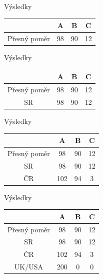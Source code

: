 \documentclass[17pt]{beamer}
\begin{document}
\begin{frame}{Výsledky}
\begin{center}
\begin{tabular}{|c|c|c|c|} \hline
  & A & B & C \\ \hline 
Přesný poměr & 98 & 90 & 12\\ \hline
\end{tabular}
\end{center} 
\end{frame}

\begin{frame}{Výsledky}
\begin{center}
\begin{tabular}{|c|c|c|c|} \hline
  & A & B & C \\ \hline 
Přesný poměr & 98 & 90 & 12\\ \hline
SR & 98 & 90 & 12\\ \hline
\end{tabular}
\end{center} 
\end{frame}

\begin{frame}{Výsledky}
\begin{center}
\begin{tabular}{|c|c|c|c|} \hline
  & A & B & C \\ \hline 
Přesný poměr & 98 & 90 & 12\\ \hline
SR & 98 & 90 & 12\\ \hline
ČR & 102 & 94 & 3\\ \hline
\end{tabular}
\end{center} 
\end{frame}

\begin{frame}{Výsledky}
\begin{center}
\begin{tabular}{|c|c|c|c|} \hline
  & A & B & C \\ \hline 
Přesný poměr & 98 & 90 & 12\\ \hline
SR & 98 & 90 & 12\\ \hline
ČR & 102 & 94 & 3\\ \hline
UK/USA & 200 & 0 & 0\\ \hline
\end{tabular}
\end{center} 
\end{frame}
\end{document}

